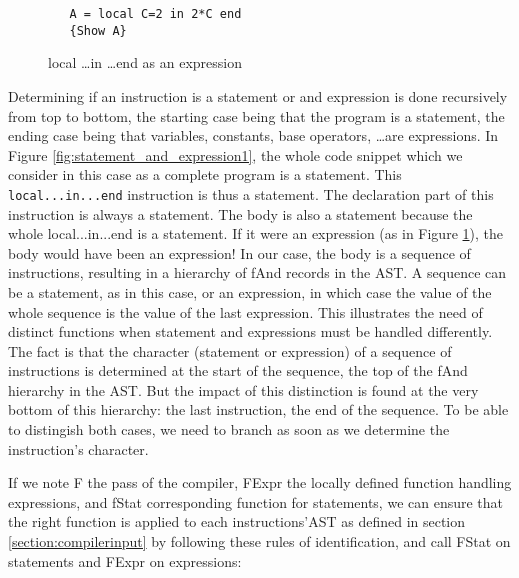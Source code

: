 \documentclass[a4paper]{memoir}
\begin{document}
\begin{figure}[h]
\begin{lstlisting}
   A = local C=2 in 2*C end
   {Show A}
\end{lstlisting}
\caption{local \ldots in \ldots end as an expression}
\label{fig:statement_and_expression2}
\end{figure}

Determining if an instruction is a statement or and expression is done
recursively from top to bottom, the starting case being that the program is a
statement, the ending case being that variables, constants, base operators,
\ldots are expressions.  In Figure \ref{fig:statement_and_expression1}, the
whole code snippet which we consider in this case as a complete program is a
statement. This \lstinline!local...in...end! instruction is thus a statement.
The declaration part of this instruction is always a statement. The body is
also a statement because the whole local...in...end is a statement. If it were
an expression (as in Figure \ref{fig:statement_and_expression2}), the body
would have been an expression! In our case, the body is a sequence of
instructions, resulting in a hierarchy of fAnd records in the AST. A sequence
can be a statement, as in this case, or an expression, in which case the value
of the whole sequence is the value of the last expression. This illustrates the
need of distinct functions when statement and expressions must be handled
differently. The fact is that the character (statement or
expression) of a sequence of instructions is determined at the start of the
sequence, the top of the fAnd hierarchy in the AST. But the impact of this
distinction is found at the very bottom of this hierarchy: the last
instruction, the end of the sequence. To be able to distingish both cases, we
need to branch as soon as we determine the instruction's character.

If we note F the pass of the compiler, FExpr the locally defined function handling expressions, and fStat corresponding function for statements, we can ensure that the right function is applied to each instructions'AST as defined in section \ref{section:compilerinput} by following these rules of identification, and call FStat on statements and FExpr on expressions:
\end{document}
